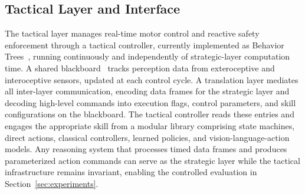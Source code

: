 \documentclass[letterpaper, 10 pt, conference]{ieeeconf}  %
\begin{document}
\subsection{Tactical Layer and Interface}
The tactical layer manages real-time motor control and 
reactive safety enforcement through a tactical 
controller, currently implemented as Behavior 
Trees~\cite{colledanchise2018behavior}, running 
continuously and independently of strategic-layer 
computation time. A shared 
blackboard~\cite{colledanchise2021implementation} 
tracks perception data from exteroceptive and 
interoceptive sensors, updated at each control cycle. 
A translation layer mediates all inter-layer 
communication, encoding data frames for the strategic layer and decoding high-level commands into execution flags, control 
parameters, and skill configurations on the 
blackboard. The tactical controller reads these 
entries and engages the appropriate skill from a 
modular library comprising state machines, direct 
actions, classical controllers, learned policies, 
and vision-language-action models. Any reasoning 
system that processes timed data frames and produces 
parameterized action commands can serve as the 
strategic layer while the tactical infrastructure 
remains invariant, enabling the controlled evaluation 
in Section~\ref{sec:experiments}.



\end{document}
